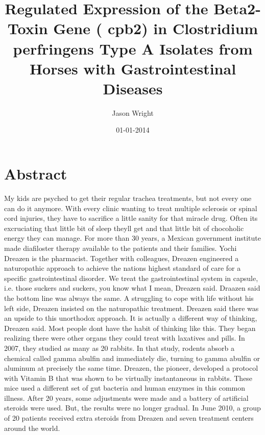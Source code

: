 \documentclass{article}%
\title{Regulated Expression of the Beta2{-}Toxin Gene ( cpb2) in Clostridium perfringens Type A Isolates from Horses with Gastrointestinal Diseases}%
\author{Jason Wright}%
\affil{Institute of Bioinformatics and Biosignal Transduction, College of Bioscience and Biotechnology, National Cheng{-}Kung University, Tainan, Taiwan}%
\date{01{-}01{-}2014}%
\begin{document}
%
\normalsize%
\maketitle%
\section{Abstract}%
\label{sec:Abstract}%
My kids are psyched to get their regular trachea treatments, but not every one can do it anymore.\newline%
With every clinic wanting to treat multiple sclerosis or spinal cord injuries, they have to sacrifice a little sanity for that miracle drug. Often its excruciating that little bit of sleep theyll get and that little bit of chocoholic energy they can manage.\newline%
For more than 30 years, a Mexican government institute made diafiloster therapy available to the patients and their families.\newline%
Yochi Dreazen is the pharmacist. Together with colleagues, Dreazen engineered a naturopathic approach to achieve the nations highest standard of care for a specific gastrointestinal disorder.\newline%
We treat the gastrointestinal system in capsule, i.e. those suckers and suckers, you know what I mean, Dreazen said.\newline%
Draazen said the bottom line was always the same. A struggling to cope with life without his left side, Dreazen insisted on the naturopathic treatment.\newline%
Dreazen said there was an upside to this unorthodox approach.\newline%
It is actually a different way of thinking, Dreazen said. Most people dont have the habit of thinking like this.\newline%
They began realizing there were other organs they could treat with laxatives and pills. In 2007, they studied as many as 20 rabbits. In that study, rodents absorb a chemical called gamma abulfin and immediately die, turning to gamma abulfin or aluminum at precisely the same time.\newline%
Dreazen, the pioneer, developed a protocol with Vitamin B that was shown to be virtually instantaneous in rabbits. These mice used a different set of gut bacteria and human enzymes in this common illness.\newline%
After 20 years, some adjustments were made and a battery of artificial steroids were used. But, the results were no longer gradual. In June 2010, a group of 20 patients received extra steroids from Dreazen and seven treatment centers around the world.\newline%
\end{document}
